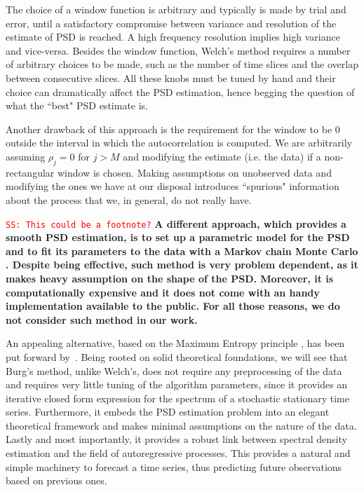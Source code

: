 \documentclass{aa}
\newcommand{\sschmidt}[1]{{\textcolor{red}{\texttt{SS: #1}} }}
\begin{document}
The choice of a window function is arbitrary and typically is made by trial and error, until a satisfactory compromise between variance and resolution of the estimate of PSD is reached. A high frequency resolution implies high variance and vice-versa.
Besides the window function, Welch's method requires a number of arbitrary choices to be made, such as the number of time slices and the overlap between consecutive slices. All these knobs must be tuned by hand and their choice can dramatically affect the PSD estimation, hence begging the question of what the ``best" PSD estimate is.

Another drawback of this approach is the requirement for the window to be $0$ outside the interval in which the autocorrelation is computed.
We are arbitrarily assuming $\rho_j = 0$ for $j > M$ and modifying the estimate (i.e. the data) if a non-rectangular window is chosen.
Making assumptions on unobserved data and modifying the ones we have at our disposal introduces ``spurious" information about the process that we, in general, do not really have.

\sschmidt{This could be a footnote?}\textbf{A different approach, which provides a smooth PSD estimation, is to set up a parametric model for the PSD and to fit its parameters to the data with a Markov chain Monte Carlo \cite{Cornish_2015, Littenberg_2015}. Despite being effective, such method is very problem dependent, as it makes heavy assumption on the shape of the PSD. Moreover, it is computationally expensive and it does not come with an handy implementation available to the public. For all those reasons, we do not consider such method in our work.}

An appealing alternative, based on the Maximum Entropy principle \citep{JaynesArticle,jaynes2003ptl, Jaynes_MAXENT}, has been put forward by~\citet{burg1975maximum}. Being rooted on solid theoretical foundations, we will see that Burg's method, unlike Welch's, does not require any preprocessing of the data and requires very little tuning of the algorithm parameters, since it provides an iterative closed form expression for the spectrum of a stochastic stationary time series. Furthermore, it embeds the PSD estimation problem into an elegant theoretical framework and makes minimal assumptions on the nature of the data.
Lastly and most importantly, it provides a robust link between spectral density estimation and the field of autoregressive processes. This provides a natural and simple machinery to forecast a time series, thus predicting future observations based on previous ones.
\end{document}
